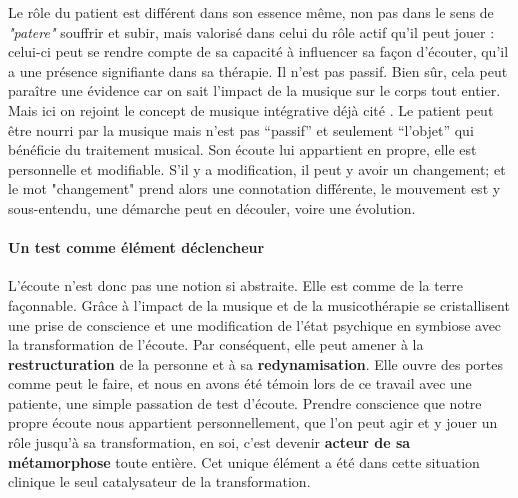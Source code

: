 	
	Le rôle du patient est différent dans son
        essence même, non pas dans le sens de\textit{ "patere"
        }souffrir et subir, mais valorisé dans celui du rôle actif
        qu'il peut jouer : celui-ci peut se rendre compte de sa
        capacité à influencer sa façon d'écouter, qu'il a une présence
        signifiante dans sa thérapie.  Il n'est pas passif. Bien sûr,
        cela peut paraître une évidence car on sait l'impact de la
        musique sur le corps tout entier. Mais ici on rejoint  le
        concept de musique intégrative déjà cité \autocite[Cf.]
        {vrait_musicotherapie_2018}. Le patient peut être nourri par
        la musique mais n'est pas ``passif'' et seulement ``l'objet'' qui bénéficie du traitement musical. Son  écoute lui appartient en propre, elle est personnelle et modifiable. S'il y a modification, il peut y avoir un changement; et le mot "changement" prend alors une connotation différente,  le mouvement est y  sous-entendu,  une démarche peut en découler, voire une évolution. 





        
        \paragraph{Un test comme élément déclencheur}

        

L'écoute n'est donc pas une notion si abstraite. Elle est comme de la terre façonnable.
 Grâce à l'impact de la musique et de la musicothérapie se cristallisent
 une prise de conscience et une modification
 de  l'état psychique en symbiose avec la transformation de
 l'écoute. Par conséquent, elle peut amener à la \textbf{restructuration }de la personne et à
 sa \textbf{redynamisation}.
 Elle ouvre des portes comme peut le faire, et nous
 en avons été témoin lors de ce travail avec une patiente, une simple passation de test d'écoute. 
  Prendre conscience que notre propre écoute nous appartient
  personnellement, que l'on peut agir et y jouer un rôle jusqu'à sa
  transformation, en soi, c'est devenir \textbf{ acteur de sa
    métamorphose} toute entière.
  Cet unique élément a été dans cette situation clinique le seul
  catalysateur de la transformation.





